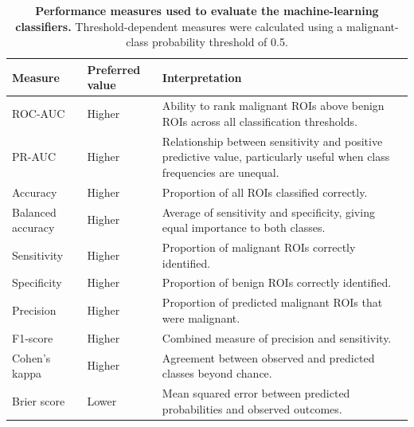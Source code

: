 \documentclass[12pt,twocolumn]{article}
\begin{document}
\begin{table}[htbp]
\centering
\caption{\textbf{Performance measures used to evaluate the
machine-learning classifiers.} Threshold-dependent measures were
calculated using a malignant-class probability threshold of 0.5.}
\label{tab:evaluation_metrics}
\small
\begin{tabularx}{\textwidth}{p{2.8cm} p{2.5cm} X}
\toprule
\textbf{Measure} &
\textbf{Preferred value} &
\textbf{Interpretation} \\
\midrule

ROC-AUC &
Higher &
Ability to rank malignant ROIs above benign ROIs across all
classification thresholds. \\

PR-AUC &
Higher &
Relationship between sensitivity and positive predictive value,
particularly useful when class frequencies are unequal. \\

Accuracy &
Higher &
Proportion of all ROIs classified correctly. \\

Balanced accuracy &
Higher &
Average of sensitivity and specificity, giving equal importance to
both classes. \\

Sensitivity &
Higher &
Proportion of malignant ROIs correctly identified. \\

Specificity &
Higher &
Proportion of benign ROIs correctly identified. \\

Precision &
Higher &
Proportion of predicted malignant ROIs that were malignant. \\

F1-score &
Higher &
Combined measure of precision and sensitivity. \\

Cohen's kappa &
Higher &
Agreement between observed and predicted classes beyond chance. \\

Brier score &
Lower &
Mean squared error between predicted probabilities and observed
outcomes. \\

\bottomrule
\end{tabularx}
\end{table}
\end{document}
